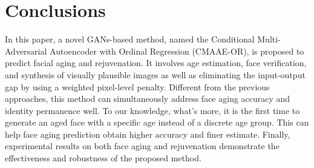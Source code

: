\documentclass{article}
\begin{document}
\section{Conclusions}\label{con}
In this paper, a novel GANs-based method, named the Conditional Multi-Adversarial Autoencoder with Ordinal Regression (CMAAE-OR), is proposed to predict facial aging and rejuvenation.  It involves age estimation, face verification, and synthesis of visually  plausible images as well as eliminating the input-output gap by using a weighted pixel-level penalty. Different from the previous approaches, this method can simultaneously address face aging accuracy and identity permanence well. To our knowledge, what's more, it is the first time to generate an aged face with a specific age instead of a discrete age group. This can help face aging prediction obtain higher accuracy and finer estimate. Finally, experimental results on both face aging and rejuvenation demonstrate the effectiveness and robustness of the proposed method.






\newpage

\end{document}
